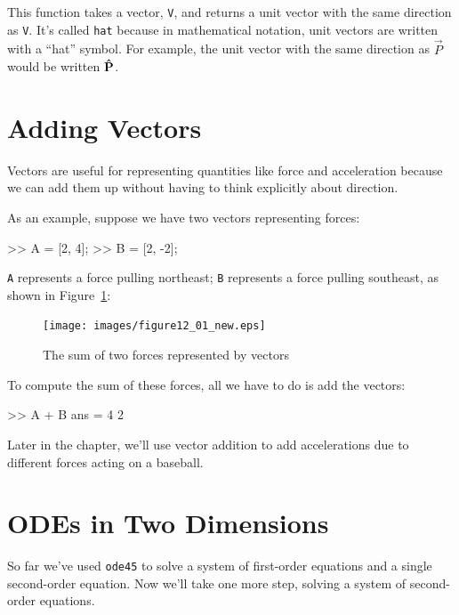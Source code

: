 This function takes a vector, \lstinline{V}, and returns a unit vector with the same direction as \lstinline{V}.  It's called \lstinline{hat} because in mathematical notation, unit vectors are written with a ``hat'' symbol.
For example, the unit vector with the same direction as $\vec{P}$ would be written $\uvec{P}$.


\section{Adding Vectors}

Vectors are useful for representing quantities like force and acceleration because we can add them up without having to think explicitly about direction.


As an example, suppose we have two vectors representing forces:

\begin{code}
>> A = [2, 4];
>> B = [2, -2];
\end{code}

\lstinline{A} represents a force pulling northeast; \lstinline{B} represents a force pulling southeast, as shown in Figure~\ref{fig:vector2}:

\begin{figure}[h]
\centerline{\texttt{[image: images/figure12\_01\_new.eps]}}
\caption{The sum of two forces represented by vectors}
\label{fig:vector2}
\end{figure}

To compute the sum of these forces, all we have to do is add the vectors:

\begin{code}
>> A + B
ans = 4     2
\end{code}

Later in the chapter, we'll use vector addition to add accelerations due to different forces acting on a baseball.


\section{ODEs in Two Dimensions}
\label{projectile}

So far we've used \lstinline{ode45} to solve a system of first-order equations and a single second-order equation.  Now we'll take one more step, solving a system  of second-order equations.

